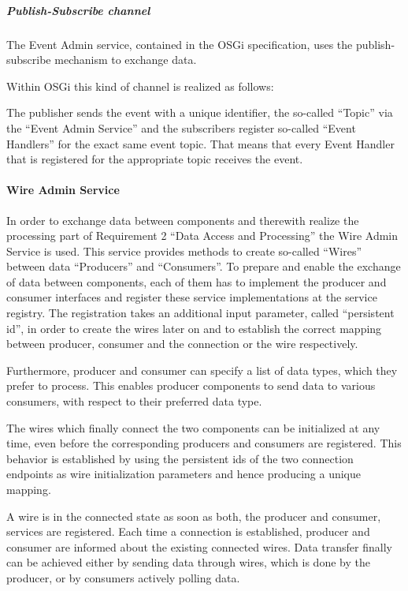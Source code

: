 \subparagraph{Publish-Subscribe channel}
The Event Admin service, contained in the OSGi specification, uses the
publish-subscribe mechanism to exchange data.


Within OSGi this kind of channel \cite{Hohpe2003} is realized as follows:

The publisher sends the event with a unique identifier, the so-called ``Topic''
via the ``Event Admin Service'' and the subscribers register so-called ``Event Handlers''
for the exact same event topic. That means that every Event Handler that is
registered for the appropriate topic receives the event.

\paragraph{Wire Admin Service}
\label{sec:wire_admin}
In order to exchange data between components and therewith realize the processing part of
Requirement 2 ``Data Access and Processing'' the Wire Admin Service is used. This service provides
methods to create so-called ``Wires'' between data ``Producers'' and ``Consumers''. To prepare and
enable the exchange of data between components, each of them has to implement the producer and
consumer interfaces and register these service implementations at the service registry. The
registration takes an additional input parameter, called ``persistent id'', in order to create the
wires later on and to establish the correct mapping between producer, consumer and the connection or
the wire respectively.

Furthermore, producer and consumer can specify a list of data types, which they
prefer to process. This enables producer components to send data to various
consumers, with respect to their preferred data type.

The wires which finally connect the two components can be initialized at any
time, even before the corresponding producers and consumers are registered.
This behavior is established by using the persistent ids of the two
connection endpoints as wire initialization parameters and hence producing a
unique mapping.

A wire is in the connected state as soon as both, the producer and consumer,
services are registered. Each time a connection is established, producer and
consumer are informed about the existing connected wires. Data transfer finally
can be achieved either by sending data through wires, which is done by
the producer, or by consumers actively polling data.

